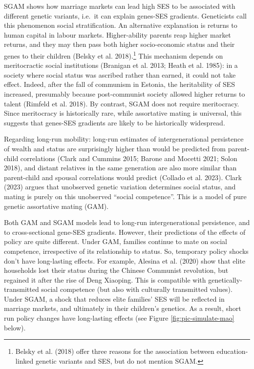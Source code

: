 \documentclass[
  12pt,
]{article}
\theoremstyle{definition}
\theoremstyle{definition}
\theoremstyle{definition}
\theoremstyle{definition}
\theoremstyle{remark}
\begin{document}
SGAM shows how marriage markets can lead high SES to be associated with
different genetic variants, i.e.~it can explain genes-SES gradients.
Geneticists call this phenomenon social stratification. An alternative
explanation is returns to human capital in labour markets.
Higher-ability parents reap higher market returns, and they may then
pass both higher socio-economic status and their genes to their children
({Belsky et al.} 2018).\footnote{{Belsky et al.} (2018) offer three reasons for the association between
  education-linked genetic variants and SES, but do not mention SGAM.} This mechanism depends on meritocractic social
institutions (Branigan et al. 2013; Heath et al. 1985): in a society where
social status was ascribed rather than earned, it could not take effect.
Indeed, after the fall of communism in Estonia, the heritability of SES
increased, presumably because post-communist society allowed higher
returns to talent (Rimfeld et al. 2018). By contrast, SGAM does not require
meritocracy. Since meritocracy is historically rare, while assortative
mating is universal, this suggests that genes-SES gradients are likely
to be historically widespread.

Regarding long-run mobility: long-run estimates of intergenerational
persistence of wealth and status are surprisingly higher than would be
predicted from parent-child correlations (Clark and Cummins 2015; Barone and Mocetti 2021; Solon 2018), and distant relatives in
the same generation are also more similar than parent-child and spousal
correlations would predict (Collado et al. 2023).
Clark (2023) argues that unobserved genetic variation
determines social status, and mating is purely on this unobserved
``social competence''. This is a model of pure genetic assortative mating
(GAM).

Both GAM and SGAM models lead to long-run intergenerational persistence,
and to cross-sectional gene-SES gradients. However, their predictions of
the effects of policy are quite different. Under GAM, families continue
to mate on social competence, irrespective of its relationship to
status. So, temporary policy shocks don't have long-lasting effects. For
example, {Alesina et al.} (2020) show that elite households lost their
status during the Chinese Communist revolution, but regained it after
the rise of Deng Xiaoping. This is compatible with
genetically-transmitted social competence (but also with culturally
transmitted values). Under SGAM, a shock that reduces elite families'
SES will be reflected in marriage markets, and ultimately in their
children's genetics. As a result, short run policy changes have
long-lasting effects (see Figure \ref{fig:pic-simulate-mao} below).
\end{document}
